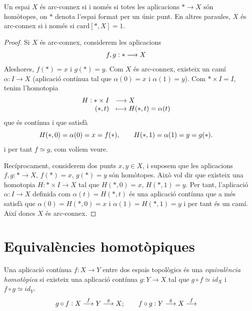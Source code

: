 \documentclass[../main.tex]{subfiles}
\begin{document}
\begin{coro}
[Exercici 6]\label{exercici1.6} Un espai $X$ és arc-connex si i només si totes les aplicacions $*\rightarrow X$ són homòtopes, on $*$ denota l'espai format per un únic punt. En altres paraules, $X$ és arc-connex si i només si $\text{card}[*,X]=1$.
\end{coro}
\begin{proof}
Si $X$ és arc-connex, considerem les aplicacions 
\begin{equation}
    \notag
    f,g:*\longrightarrow X
\end{equation}
Aleshores, $f(*) = x$ i $g(*) = y$. Com $X$ és arc-connex, existeix un camí $\alpha:I\rightarrow X$ (aplicació contínua tal que $\alpha(0) = x$ i $\alpha(1) = y$). Com $*\times I = I$, tenim l'homotopia 
\begin{equation}
    \notag
    \begin{array}{rl}
        H:*\times I & \longrightarrow X \\
        (*,t) & \longmapsto H(*,t) = \alpha(t) 
    \end{array}
\end{equation}
que és contínua i que satisfà
\begin{equation}
    \notag
    H(*,0) = \alpha(0) = x = f(*),\qquad H(*,1) = \alpha(1) = y = g(*).
\end{equation}
i per tant $f\simeq g$, com volíem veure.

Recíprocament, considerem dos punts $x,y\in X$, i suposem que les aplicacions $f,g:*\rightarrow X$, $f(*)=x$, $g(*)=y$ són homòtopes. Això vol dir que existeix una homotopia $H:*\times I\rightarrow X$ tal que $H(*,0) = x$, $H(*,1)=y$. Per tant, l'aplicació $\alpha:I\rightarrow X$ definida com $\alpha(t) = H(*,t)$ és una aplicació contínua que a més satisfà que $\alpha(0) = H(*,0) = x$ i $\alpha(1) = H(*,1) = y$ i per tant és un camí. Així doncs $X$ és arc-connex.
\end{proof}



\section{Equivalències homotòpiques}

\begin{defi}
\label{def:equivalenciahomotopica} Una aplicació contínua $f:X\rightarrow Y$ entre dos espais topològics és una \textit{equivalència homotòpica} si existeix una aplicació contínua $g:Y\rightarrow X$ tal que $g\circ f\simeq id_X$ i $f\circ g\simeq id_Y$.
\begin{equation}
    \notag
    g\circ f: X\overset{f}{\longrightarrow} Y \overset{g}{\longrightarrow} X;\qquad f\circ g: Y\overset{g}{\longrightarrow}X\overset{f}{\longrightarrow}
\end{equation}
\end{defi}
\end{document}
